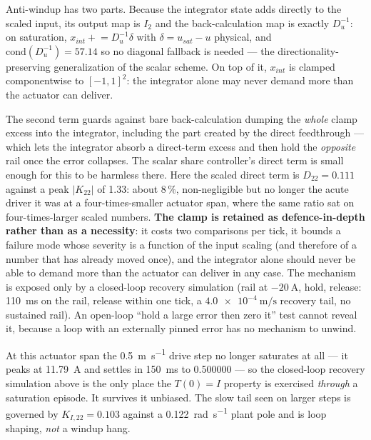 \documentclass[energies,article,submit,pdftex,oneauthor]{Definitions/mdpi}
\begin{document}
Anti-windup has two parts. Because the integrator state adds directly to the scaled input, its
output map is $I_2$ and the back-calculation map is exactly $D_u^{-1}$: on saturation,
$x_{int} \mathrel{+}= D_u^{-1}\delta$ with $\delta = u_{sat}-u$ physical, and
$\mathrm{cond}(D_u^{-1}) = 57.14$ so no diagonal fallback is needed --- the
directionality-preserving generalization of the scalar scheme. On top of it, $x_{int}$ is clamped
componentwise to $[-1,1]^2$: the integrator alone may never demand more than the actuator can
deliver.

The second term guards against bare back-calculation dumping the \emph{whole} clamp excess into
the integrator, including the part created by the direct feedthrough --- which lets the integrator
absorb a direct-term excess and then hold the \emph{opposite} rail once the error collapses. The
scalar share controller's direct term is small enough for this to be harmless there. Here the
scaled direct term is $D_{22} = 0.111$ against a peak $|K_{22}|$ of \num{1.33}: about $8\,\%$,
non-negligible but no longer the acute driver it was at a four-times-smaller actuator span, where
the same ratio sat on four-times-larger scaled numbers. \textbf{The clamp is retained as
defence-in-depth rather than as a necessity}: it costs two comparisons per tick, it bounds a
failure mode whose severity is a function of the input scaling (and therefore of a number that has
already moved once), and the integrator alone should never be able to demand more than the
actuator can deliver in any case. The mechanism is exposed only by a closed-loop recovery
simulation (rail at $-\SI{20}{\ampere}$, hold, release: \SI{110}{\milli\second} on the rail,
release within one tick, a $\SI{4.0e-4}{\meter\per\second}$ recovery tail, no sustained rail). An
open-loop ``hold a large error then zero it'' test cannot reveal it, because a loop with an
externally pinned error has no mechanism to unwind.

At this actuator span the \SI{0.5}{\meter\per\second} drive step no longer saturates at all --- it
peaks at \SI{11.79}{\ampere} and settles in \SI{150}{\milli\second} to \num{0.500000} --- so the
closed-loop recovery simulation above is the only place the $T(0)=I$ property is exercised
\emph{through} a saturation episode. It survives it unbiased. The slow tail seen on larger steps
is governed by $K_{I,22} = 0.103$ against a \SI{0.122}{\radian\per\second} plant pole and is loop
shaping, \emph{not} a windup hang.
\end{document}
